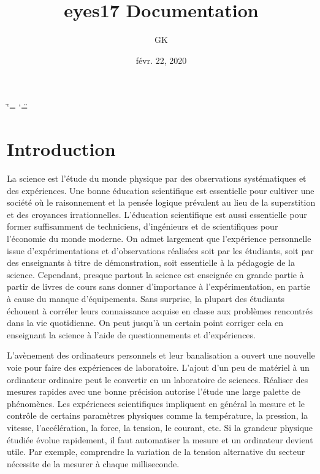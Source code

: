 \documentclass[a4paper,12pt,french]{sphinxmanual}
\title{eyes17 Documentation}
\date{févr. 22, 2020}
\author{GK}
\begin{document}
\ifdefined\shorthandoff
  \ifnum\catcode`\=\string=\active\shorthandoff{=}\fi
  \ifnum\catcode`\"=\active{}\fi
\fi

\pagestyle{empty}


\pagestyle{plain}
\sphinxtableofcontents
\pagestyle{normal}
\label{\detokenize{index::doc}}



\chapter{Introduction}
\label{\detokenize{1.1:introduction}}\label{\detokenize{1.1::doc}}
La science est l’étude du monde physique par des observations systématiques
et des expériences. Une bonne éducation scientifique est essentielle
pour cultiver une société où le raisonnement et la pensée logique
prévalent au lieu de la superstition et des croyances irrationnelles.
L’éducation scientifique est aussi essentielle pour former suffisamment
de techniciens, d’ingénieurs et de scientifiques pour l’économie du
monde moderne. On admet largement que l’expérience personnelle issue
d’expérimentations et d’observations réalisées soit par les étudiants,
soit par des enseignants à titre de démonstration, soit essentielle
à la pédagogie de la science. Cependant, presque partout la science
est enseignée en grande partie à partir de livres de cours sans donner
d’importance à l’expérimentation, en partie à cause du manque d’équipements.
Sans surprise, la plupart des étudiants échouent à corréler leurs
connaissance acquise en classe aux problèmes rencontrés dans la vie
quotidienne. On peut jusqu’à un certain point corriger cela en enseignant
la science à l’aide de questionnements et d’expériences.

L’avènement des ordinateurs personnels et leur banalisation a ouvert
une nouvelle voie pour faire des expériences de laboratoire. L’ajout
d’un peu de matériel à un ordinateur ordinaire peut le convertir en
un laboratoire de sciences. Réaliser des mesures rapides avec une
bonne précision autorise l’étude une large palette de phénomènes.
Les expériences scientifiques impliquent en général la mesure et le
contrôle de certains paramètres physiques comme la température, la
pression, la vitesse, l’accélération, la force, la tension, le courant,
etc. Si la grandeur physique étudiée évolue rapidement, il faut automatiser
la mesure et un ordinateur devient utile. Par exemple, comprendre
la variation de la tension alternative du secteur nécessite de la
mesurer à chaque milliseconde.
\end{document}
